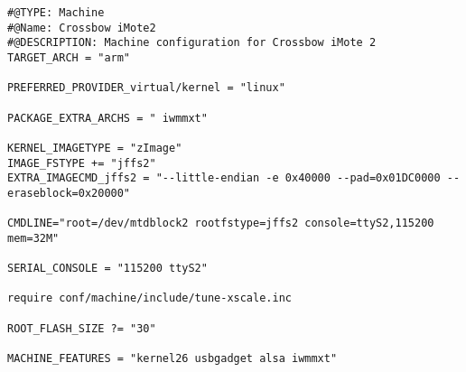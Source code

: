 \begin{verbatim}
#@TYPE: Machine
#@Name: Crossbow iMote2
#@DESCRIPTION: Machine configuration for Crossbow iMote 2
TARGET_ARCH = "arm"

PREFERRED_PROVIDER_virtual/kernel = "linux"

PACKAGE_EXTRA_ARCHS = " iwmmxt"

KERNEL_IMAGETYPE = "zImage"
IMAGE_FSTYPE += "jffs2"
EXTRA_IMAGECMD_jffs2 = "--little-endian -e 0x40000 --pad=0x01DC0000 --eraseblock=0x20000"

CMDLINE="root=/dev/mtdblock2 rootfstype=jffs2 console=ttyS2,115200 mem=32M"

SERIAL_CONSOLE = "115200 ttyS2"

require conf/machine/include/tune-xscale.inc

ROOT_FLASH_SIZE ?= "30"

MACHINE_FEATURES = "kernel26 usbgadget alsa iwmmxt"
\end{verbatim}
